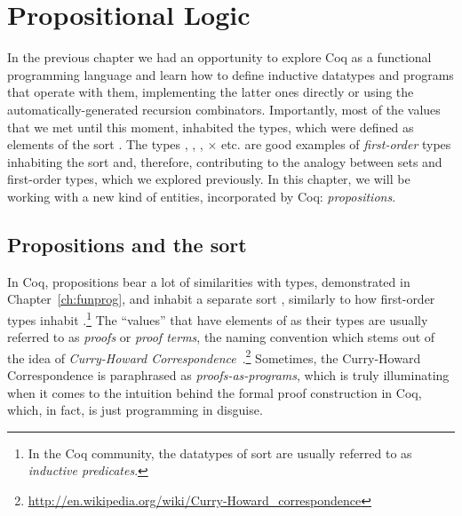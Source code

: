 \begin{coqdoccode}
\coqdocemptyline
\coqdocemptyline
\end{coqdoccode}

\chapter{Propositional Logic}
\label{ch:logic}
 



In the previous chapter we had an opportunity to explore Coq as a
functional programming language and learn how to define inductive
datatypes and programs that operate with them, implementing the latter
ones directly or using the automatically-generated recursion
combinators. Importantly, most of the values that we met until this
moment, inhabited the types, which were defined as elements of the
sort . The types , , ,  \ensuremath{\times}  etc. are
good examples of \textit{first-order} types inhabiting the sort  and,
therefore, contributing to the analogy between sets and first-order
types, which we explored previously.  In this chapter, we will be
working with a new kind of entities, incorporated by Coq:
\textit{propositions}.


\section{Propositions and the \texorpdfstring{\protect{}}{Prop} sort}


\label{sec:propsort}


In Coq, propositions bear a lot of similarities with types,
demonstrated in Chapter~\ref{ch:funprog}, and inhabit a separate
sort , similarly to how first-order types inhabit
.\footnote{In the Coq community, the datatypes of   
sort are usually referred to as \emph{inductive
predicates}.} The ``values'' that have
elements of  as their types are usually referred to as \textit{proofs}
or \textit{proof terms}, the naming convention which stems out of the idea of
 \emph{Curry-Howard
Correspondence}~\cite{Curry:34,Howard:80}.\footnote{\url{http://en.wikipedia.org/wiki/Curry-Howard_correspondence}}
Sometimes, the Curry-Howard Correspondence is paraphrased as
\textit{proofs-as-programs}, which is truly illuminating when it comes to the
intuition behind the formal proof construction in Coq, which, in fact,
is just programming in disguise.


